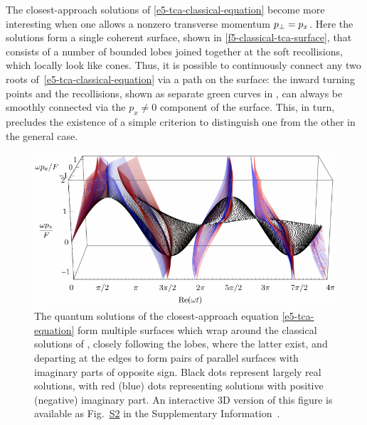 The closest-approach solutions of \eqref{e5-tca-classical-equation} become more interesting when one allows a nonzero transverse momentum ${p_{\perp}}=p_x$. Here the solutions form a single coherent surface, shown in \ref{f5-classical-tca-surface}, that consists of a number of bounded lobes joined together at the soft recollisions, which locally look like cones. Thus, it is possible to continuously connect any two roots of~\eqref{e5-tca-classical-equation} via a path on the surface: the inward turning points and the recollisions, shown as separate green curves in , can always be smoothly connected via the $p_x\neq 0$ component of the surface. This, in turn, precludes the existence of a simple criterion to distinguish one from the other in the general case.







\begin{figure}[t!]
  \centering
  \includegraphics[scale=1]{5-Quantum-orbits/Figures/figure5I.pdf}
  \caption[
  Quantum solutions of the closest-approach equation
  ]{
  The quantum solutions of the closest-approach equation \eqref{e5-tca-equation} form multiple surfaces which wrap around the classical solutions of , closely following the lobes, where the latter exist, and departing at the edges to form pairs of parallel surfaces with imaginary parts of opposite sign. 
  Black dots represent largely real solutions, with red (blue) dots representing solutions with positive (negative) imaginary part.
  An interactive 3D version of this figure is available as Fig.~\href{https://electrondynamicsincomplextimeandspace.github.io/\#figure-s2}{S2} in the Supplementary Information~\cite{SupplementaryInformation}.
 }
  \label{f5-quantum-tca-surface}
\end{figure}


